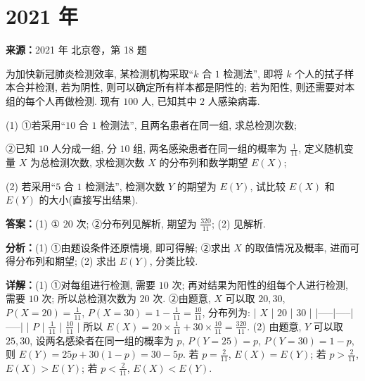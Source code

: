 \section*{2021 年}

\begin{question}[points=14]
\textbf{来源：}2021 年 北京卷，第 18 题\par
为加快新冠肺炎检测效率, 某检测机构采取“$k$ 合 $1$ 检测法”, 即将 $k$ 个人的拭子样本合并检测, 若为阴性, 则可以确定所有样本都是阴性的; 若为阳性, 则还需要对本组的每个人再做检测. 现有 $100$ 人, 已知其中 $2$ 人感染病毒.

(1) ①若采用“$10$ 合 $1$ 检测法”, 且两名患者在同一组, 求总检测次数;

②已知 $10$ 人分成一组, 分 $10$ 组, 两名感染患者在同一组的概率为 $\frac{1}{11}$, 定义随机变量 $X$ 为总检测次数, 求检测次数 $X$ 的分布列和数学期望 $E(X)$;

(2) 若采用“$5$ 合 $1$ 检测法”, 检测次数 $Y$ 的期望为 $E(Y)$, 试比较 $E(X)$ 和 $E(Y)$ 的大小(直接写出结果).
\begin{solution}
\textbf{答案：}(1) ① $20$ 次; ②分布列见解析, 期望为 $\frac{320}{11}$; (2) 见解析.

\textbf{分析：}(1) ①由题设条件还原情境, 即可得解; ②求出 $X$ 的取值情况及概率, 进而可得分布列和期望; (2) 求出 $E(Y)$, 分类比较.

\textbf{详解：}(1) ①对每组进行检测, 需要 $10$ 次; 再对结果为阳性的组每个人进行检测, 需要 $10$ 次; 所以总检测次数为 $20$ 次.
②由题意, $X$ 可以取 $20,30$, $P(X=20)=\frac{1}{11}$, $P(X=30)=1-\frac{1}{11}=\frac{10}{11}$, 分布列为:
| $X$ | $20$ | $30$ |
|-----|-----|-----|
| $P$ | $\frac{1}{11}$ | $\frac{10}{11}$ |
所以 $E(X)=20\times\frac{1}{11}+30\times\frac{10}{11}=\frac{320}{11}$.
(2) 由题意, $Y$ 可以取 $25,30$, 设两名感染者在同一组的概率为 $p$, $P(Y=25)=p$, $P(Y=30)=1-p$, 则 $E(Y)=25p+30(1-p)=30-5p$. 若 $p=\frac{2}{11}$, $E(X)=E(Y)$; 若 $p>\frac{2}{11}$, $E(X)>E(Y)$; 若 $p<\frac{2}{11}$, $E(X)<E(Y)$.
\end{solution}
\end{question}

